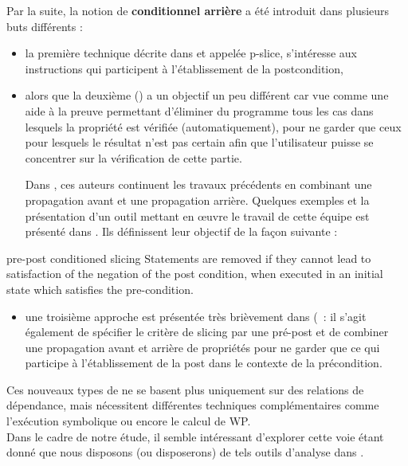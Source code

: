 Par la suite, la notion de {\bf  \slicing conditionnel arrière}
a été introduit dans plusieurs buts différents :
\begin{itemize}
\item la première technique décrite dans \cite{Comuzzi} et
 appelée p-slice, s'intéresse aux instructions qui participent
à l'établissement de la postcondition,
\item alors que la deuxième (\cite{fox01backward})
a un objectif un peu différent car vue
comme une aide à la preuve permettant d'éliminer du programme
tous les cas dans lesquels la propriété est vérifiée (automatiquement),
pour ne garder que ceux pour lesquels le résultat n'est pas certain
afin que l'utilisateur puisse se concentrer sur la vérification
de cette partie.

Dans \cite{Harman2001}, ces auteurs continuent
les travaux précédents en combinant
une propagation avant et une propagation arrière.
Quelques exemples et la présentation d'un outil mettant en {\oe}uvre
le travail de cette équipe est présenté dans \cite{daoudi-consus}.
Ils définissent leur objectif de la façon suivante :
\end{itemize}

\begin{definition}{pre-post conditioned slicing}
Statements are removed if they cannot lead to
satisfaction of the negation of the post condition,
when executed in an initial state which satisfies
the pre-condition.
\end{definition}

\begin{itemize}
\item une troisième approche est présentée très brièvement
dans (\cite{Chung-2001}~:
il s'agit également de spécifier le critère de slicing par une pré-post
et de combiner une propagation avant et arrière de propriétés
pour ne garder que ce qui participe
à l'établissement de la post dans le contexte de la précondition.
\end{itemize}




Ces nouveaux types de \slicing
ne se basent plus uniquement sur des relations de dépendance,
mais nécessitent différentes techniques complémentaires comme
l'exécution symbolique ou encore le calcul de WP.\\

Dans le cadre de notre étude, il semble intéressant d'explorer
cette voie étant donné que nous disposons (ou disposerons)
de tels outils d'analyse dans \ppc.\\







